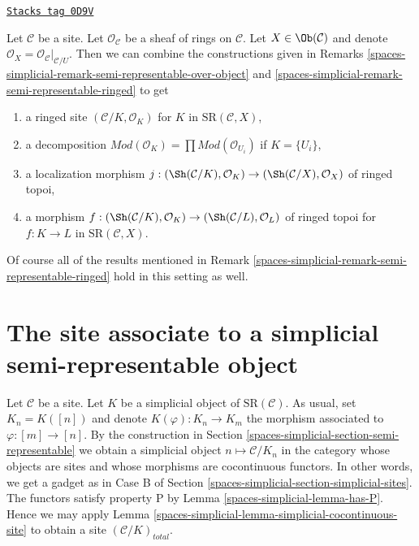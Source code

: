 \begin{remark}

\label{spaces-simplicial-remark-semi-representable-ringed-over-object}
\href{https://stacks.math.columbia.edu/tag/0D9V}{\texttt{Stacks tag 0D9V}}

Let $\mathcal{C}$ be a site. Let $\mathcal{O}_\mathcal{C}$
be a sheaf of rings on $\mathcal{C}$. Let $X \in \Ob(\mathcal{C})$
and denote $\mathcal{O}_X = \mathcal{O}_\mathcal{C}|_{\mathcal{C}/U}$.
Then we can combine the constructions given in
Remarks \ref{spaces-simplicial-remark-semi-representable-over-object}
and \ref{spaces-simplicial-remark-semi-representable-ringed} to get
\begin{enumerate}
\item a ringed site $(\mathcal{C}/K, \mathcal{O}_K)$
for $K$ in $\text{SR}(\mathcal{C}, X)$,
\item a decomposition
$\textit{Mod}(\mathcal{O}_K) =
\prod \textit{Mod}(\mathcal{O}_{U_i})$ if $K = \{U_i\}$,
\item a localization morphism
$j : (\Sh(\mathcal{C}/K), \mathcal{O}_K) \to
(\Sh(\mathcal{C}/X), \mathcal{O}_X)$
of ringed topoi,
\item a morphism
$f : (\Sh(\mathcal{C}/K), \mathcal{O}_K) \to
(\Sh(\mathcal{C}/L), \mathcal{O}_L)$ of ringed topoi
for $f : K \to L$ in $\text{SR}(\mathcal{C}, X)$.
\end{enumerate}
Of course all of the results mentioned in
Remark \ref{spaces-simplicial-remark-semi-representable-ringed}
hold in this setting as well.
\end{remark}

\section{The site associate to a simplicial semi-representable object}
\label{spaces-simplicial-section-simplicial-semi-representable}
Let $\mathcal{C}$ be a site. Let $K$ be a simplicial object of
$\text{SR}(\mathcal{C})$. As usual, set $K_n = K([n])$ and denote
$K(\varphi) : K_n \to K_m$ the morphism associated to $\varphi : [m] \to [n]$.
By the construction in
Section \ref{spaces-simplicial-section-semi-representable} we obtain a simplicial object
$n \mapsto \mathcal{C}/K_n$ in the category whose objects are sites and
whose morphisms are cocontinuous functors. In other words, we get
a gadget as in Case B of Section \ref{spaces-simplicial-section-simplicial-sites}.
The functors satisfy property P by Lemma \ref{spaces-simplicial-lemma-has-P}.
Hence we may apply
Lemma \ref{spaces-simplicial-lemma-simplicial-cocontinuous-site}
to obtain a site $(\mathcal{C}/K)_{total}$.

